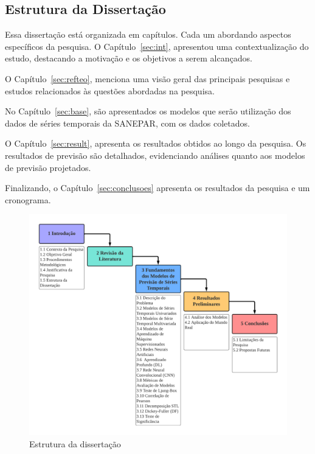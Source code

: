 \subsection{Estrutura da Disserta\c c\~ao} \label{subsec:estrutura}


Essa dissertação está organizada em capítulos. Cada um abordando aspectos específicos da pesquisa. 
O Capítulo~\ref{sec:int},  apresentou uma contextualização do estudo, destacando a motivação e os objetivos a serem alcançados. 

O Capítulo~\ref{sec:refteo}, menciona uma visão geral das principais pesquisas e estudos relacionados às questões abordadas na pesquisa.

No Capítulo~\ref{sec:base}, são apresentados os modelos que serão utilização dos dados de séries temporais da SANEPAR, com os dados coletados.


O Capítulo~\ref{sec:result}, apresenta os resultados obtidos ao longo da pesquisa.  Os resultados de previsão são detalhados, evidenciando análises quanto aos modelos de previsão projetados.

Finalizando, o Capítulo~\ref{sec:conclusoes} apresenta os resultados da pesquisa e um cronograma.


 
 \begin{figure}[!htb]
 	\centering
 	\caption{Estrutura da dissertação}
 	\label{fig:estrutura}
 	\includegraphics[width=0.9\linewidth]{Introducao/Figuras/estrutura}
 	
 	 
 \end{figure}



